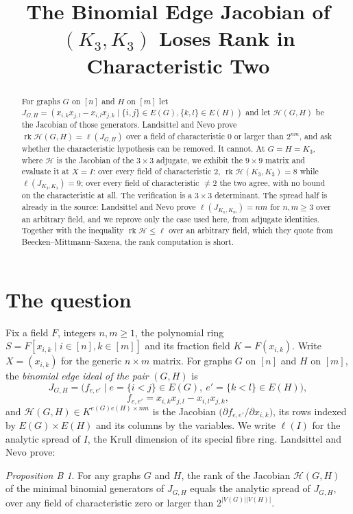 \documentclass[11pt]{amsart}
\title[Binomial edge Jacobian of $(K_3,K_3)$ in characteristic two]
{The Binomial Edge Jacobian of $(K_3,K_3)$ Loses Rank in Characteristic Two}
\date{}
\theoremstyle{remark}
\newtheorem*{propB}{Proposition B}
\DeclareMathOperator{\rk}{rk}
\newcommand{\Hm}{\mathcal H}
\begin{document}
\begin{abstract}
For graphs $G$ on $[n]$ and $H$ on $[m]$ let
$J_{G,H}=(x_{i,k}x_{j,l}-x_{i,l}x_{j,k}\mid\{i,j\}\in E(G),\{k,l\}\in E(H))$
and let $\Hm(G,H)$ be the Jacobian of those generators. Landsittel and Nevo
prove $\rk\Hm(G,H)=\ell(J_{G,H})$ over a field of characteristic $0$ or
larger than $2^{nm}$, and ask whether the characteristic hypothesis can be
removed. It cannot. At $G=H=K_3$, where $\Hm$ is the Jacobian of the
$3\times3$ adjugate, we exhibit the $9\times9$ matrix and evaluate it at
$X=I$: over every field of characteristic $2$,
$\rk\Hm(K_3,K_3)=8$ while $\ell(J_{K_3,K_3})=9$; over every field of
characteristic $\neq2$ the two agree, with no bound on the characteristic at
all. The verification is a $3\times3$ determinant. The spread half is already
in the source: Landsittel and Nevo prove $\ell(J_{K_n,K_m})=nm$ for
$n,m\ge3$ over an arbitrary field, and we reprove only the case used here,
from adjugate identities. Together with the inequality $\rk\Hm\le\ell$ over an
arbitrary field, which they quote from Beecken--Mittmann--Saxena, the rank
computation is short.
\end{abstract}

\maketitle

\section{The question}

Fix a field $F$, integers $n,m\ge1$, the polynomial ring
$S=F[x_{i,k}\mid i\in[n],k\in[m]]$ and its fraction field
$K=F(x_{i,k})$. Write $X=(x_{i,k})$ for the generic $n\times m$ matrix. For
graphs $G$ on $[n]$ and $H$ on $[m]$, the \emph{binomial edge ideal of the
pair} $(G,H)$ is
\[
 J_{G,H}=\bigl(f_{e,e'}\;\big|\;e=\{i<j\}\in E(G),\ e'=\{k<l\}\in E(H)\bigr),
\]
\[
 f_{e,e'}=x_{i,k}x_{j,l}-x_{i,l}x_{j,k},
\]
and $\Hm(G,H)\in K^{e(G)e(H)\times nm}$ is the Jacobian
$\bigl(\partial f_{e,e'}/\partial x_{i,k}\bigr)$, its rows indexed by
$E(G)\times E(H)$ and its columns by the variables. We write
$\ell(I)$ for the analytic spread of $I$, the Krull dimension of its special
fibre ring. Landsittel and Nevo \cite{LN} prove:

\begin{propB}
For any graphs $G$ and $H$, the rank of the Jacobian $\Hm(G,H)$ of the
minimal binomial generators of $J_{G,H}$ equals the analytic spread of
$J_{G,H}$, over any field of characteristic zero or larger than
$2^{|V(G)||V(H)|}$.
\end{propB}
\end{document}
